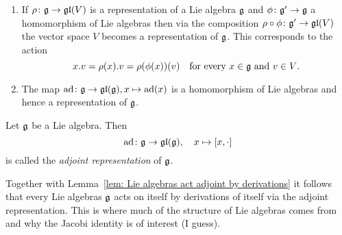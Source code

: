 \begin{examples}
\begin{enumerate}[leftmargin=*]
  \item
   If $\rho \colon \mathfrak{g} \to \mathfrak{gl}(V)$ is a representation of a Lie algebra $\mathfrak{g}$ and $\phi \colon \mathfrak{g}' \to \mathfrak{g}$ a homomorphism of Lie algebras then via the composition $\rho \circ \phi \colon \mathfrak{g}' \to \mathfrak{gl}(V)$ the vector space $V$ becomes a representation of $\mathfrak{g}$. This corresponds to the action
   \[
    x.v = \rho(x).v = \rho(\phi(x))(v) \quad \text{for every $x \in \mathfrak{g}$ and $v \in V$}.
   \]
   
  \item
   The map $\operatorname{ad} \colon \mathfrak{g} \to \mathfrak{gl}(\mathfrak{g}), x \mapsto \operatorname{ad}(x)$ is a homomorphism of Lie algebras and hence a representation of $\mathfrak{g}$.
 \end{enumerate}
\end{examples}


\begin{definition}
 Let $\mathfrak{g}$ be a Lie algebra. Then
 \[
  \operatorname{ad} \colon \mathfrak{g} \to \mathfrak{gl}(\mathfrak{g}), \quad x \mapsto [x,\cdot]
 \]
 is called the \emph{adjoint representation} of $\mathfrak{g}$.
\end{definition}


\begin{remark}
 Together with Lemma~\ref{lem: Lie algebras act adjoint by derivations} it follows that every Lie algebras $\mathfrak{g}$ acts on itself by derivations of itself via the adjoint representation. This is where much of the structure of Lie algebras comes from and why the Jacobi identity is of interest (I guess).
\end{remark}


